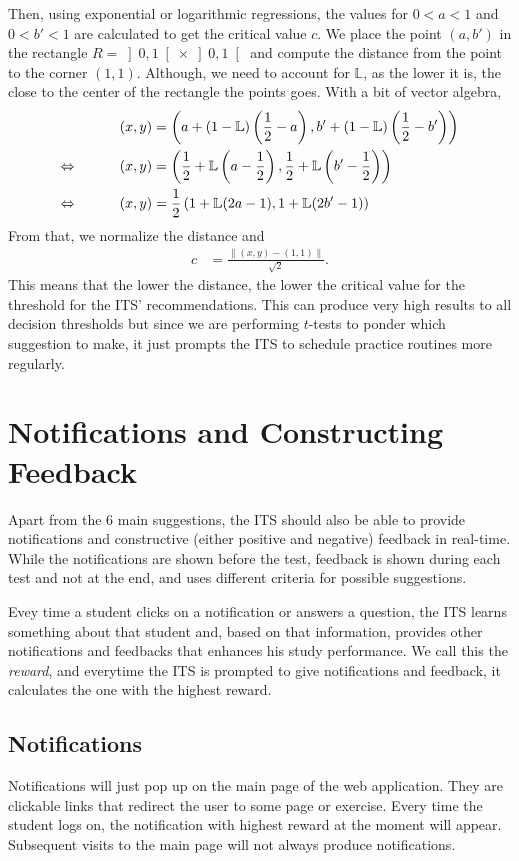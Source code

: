 \documentclass{article}
\newcommand{\0}{\mathbbold{0}}
\newcommand{\1}{\mathds{1}}
\newcommand{\LRA}{\Leftrightarrow\mkern40mu}
\newcommand{\openinter}[2]{\left]#1,#2\right[}
\begin{document}
Then, using exponential or logarithmic regressions, the values for $0<a<1$ and $0<b'<1$ are calculated to get the critical value $c$.
We place the point $(a,b')$ in the rectangle $R = \openinter{0}{1}\times\openinter{0}{1}$ and compute the distance from the point to the corner $(1,1)$.
Although, we need to account for $\mathbb{L}$, as the lower it is, the close to the center of the rectangle the points goes. With a bit of vector algebra,
\begin{alignat*}{2}
    && (x,y) &= \left(a + (1-\mathbb{L})\left(\frac{1}{2} - a\right),b' + (1-\mathbb{L})\left(\frac{1}{2} - b'\right)\right) \\
    \LRA && (x,y) &= \left(\frac{1}{2}+\mathbb{L}\left(a-\frac{1}{2}\right),\frac{1}{2}+\mathbb{L}\left(b'-\frac{1}{2}\right)\right) \\
    \LRA && (x,y) &= \frac{1}{2}\left(1+\mathbb{L}(2a-1),1+\mathbb{L}(2b'-1)\right)
\end{alignat*}
From that, we normalize the distance and
\begin{align*}
    c &= \frac{\left\|(x,y) - (1,1)\right\|}{\sqrt{2}}.
\end{align*}
This means that the lower the distance, the lower the critical value for the threshold for the ITS' recommendations. This can produce very high results to all decision thresholds but since we are performing $t$-tests to ponder which suggestion to make, it just prompts the ITS to schedule practice routines more regularly.

\section{Notifications and Constructing Feedback}
Apart from the 6 main suggestions, the ITS should also be able to provide notifications and constructive (either positive and negative) feedback in real-time. While the notifications are shown before the test, feedback is shown during each test and not at the end, and uses different criteria for possible suggestions.

Evey time a student clicks on a notification or answers a question, the ITS learns something about that student and, based on that information, provides other notifications and feedbacks that enhances his study performance.
We call this the \textsl{reward}, and everytime the ITS is prompted to give notifications and feedback, it calculates the one with the highest reward.

\subsection{Notifications}
Notifications will just pop up on the main page of the web application. They are clickable links that redirect the user to some page or exercise.
Every time the student logs on, the notification with highest reward at the moment will appear. Subsequent visits to the main page will not always produce notifications.
\end{document}
